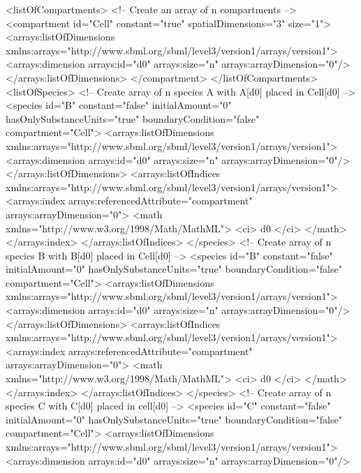 \begin{example}
<listOfCompartments>
    <!-- Create an array of n compartments -->
    <compartment id="Cell" constant="true" spatialDimensions="3" size="1">
        <arrays:listOfDimensions
            xmlns:arrays="http://www.sbml.org/sbml/level3/version1/arrays/version1">
            <arrays:dimension arrays:id="d0" arrays:size="n" arrays:arrayDimension="0"/>
        </arrays:listOfDimensions>
    </compartment>
</listOfCompartments>
<listOfSpecies>
     <!-- Create array of n species A with A[d0] placed in Cell[d0] -->
    <species id="B" constant="false" initialAmount="0" hasOnlySubstanceUnits="true"
	 boundaryCondition="false" compartment="Cell">
        <arrays:listOfDimensions
            xmlns:arrays="http://www.sbml.org/sbml/level3/version1/arrays/version1">
            <arrays:dimension arrays:id="d0" arrays:size="n" arrays:arrayDimension="0"/>
        </arrays:listOfDimensions>
        <arrays:listOfIndices
            xmlns:arrays="http://www.sbml.org/sbml/level3/version1/arrays/version1">
            <arrays:index arrays:referencedAttribute="compartment" arrays:arrayDimension="0">
                <math xmlns="http://www.w3.org/1998/Math/MathML">
                    <ci> d0 </ci>
                </math>
            </arrays:index>
        </arrays:listOfIndices>
    </species>
    <!-- Create array of n species B with B[d0] placed in Cell[d0] -->
    <species id="B" constant="false" initialAmount="0" hasOnlySubstanceUnits="true"
	 boundaryCondition="false" compartment="Cell">
        <arrays:listOfDimensions
            xmlns:arrays="http://www.sbml.org/sbml/level3/version1/arrays/version1">
            <arrays:dimension arrays:id="d0" arrays:size="n" arrays:arrayDimension="0"/>
        </arrays:listOfDimensions>
        <arrays:listOfIndices
            xmlns:arrays="http://www.sbml.org/sbml/level3/version1/arrays/version1">
            <arrays:index arrays:referencedAttribute="compartment" arrays:arrayDimension="0">
                <math xmlns="http://www.w3.org/1998/Math/MathML">
                    <ci> d0 </ci>
                </math>
            </arrays:index>
        </arrays:listOfIndices>
    </species>
    <!-- Create array of n species C with C[d0] placed in cell[d0] -->
    <species id="C" constant="false" initialAmount="0" hasOnlySubstanceUnits="true" 
	boundaryCondition="false" compartment="Cell">
        <arrays:listOfDimensions
            xmlns:arrays="http://www.sbml.org/sbml/level3/version1/arrays/version1">
            <arrays:dimension arrays:id="d0" arrays:size="n" arrays:arrayDimension="0"/>

\end{example}
